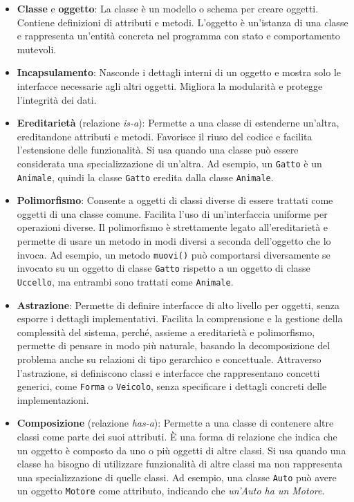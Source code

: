 \documentclass[
  letterpaper,
]{scrbook}
\begin{document}
\begin{itemize}
\item
  \textbf{Classe} e \textbf{oggetto}: La classe è un modello o schema
  per creare oggetti. Contiene definizioni di attributi e metodi.
  L'oggetto è un'istanza di una classe e rappresenta un'entità concreta
  nel programma con stato e comportamento mutevoli.
\item
  \textbf{Incapsulamento}: Nasconde i dettagli interni di un oggetto e
  mostra solo le interfacce necessarie agli altri oggetti. Migliora la
  modularità e protegge l'integrità dei dati.
\item
  \textbf{Ereditarietà} (relazione \emph{is-a}): Permette a una classe
  di estenderne un'altra, ereditandone attributi e metodi. Favorisce il
  riuso del codice e facilita l'estensione delle funzionalità. Si usa
  quando una classe può essere considerata una specializzazione di
  un'altra. Ad esempio, un \texttt{Gatto} è un \texttt{Animale}, quindi
  la classe \texttt{Gatto} eredita dalla classe \texttt{Animale}.
\item
  \textbf{Polimorfismo}: Consente a oggetti di classi diverse di essere
  trattati come oggetti di una classe comune. Facilita l'uso di
  un'interfaccia uniforme per operazioni diverse. Il polimorfismo è
  strettamente legato all'ereditarietà e permette di usare un metodo in
  modi diversi a seconda dell'oggetto che lo invoca. Ad esempio, un
  metodo \texttt{muovi()} può comportarsi diversamente se invocato su un
  oggetto di classe \texttt{Gatto} rispetto a un oggetto di classe
  \texttt{Uccello}, ma entrambi sono trattati come \texttt{Animale}.
\item
  \textbf{Astrazione}: Permette di definire interfacce di alto livello
  per oggetti, senza esporre i dettagli implementativi. Facilita la
  comprensione e la gestione della complessità del sistema, perché,
  assieme a ereditarietà e polimorfismo, permette di pensare in modo più
  naturale, basando la decomposizione del problema anche su relazioni di
  tipo gerarchico e concettuale. Attraverso l'astrazione, si definiscono
  classi e interfacce che rappresentano concetti generici, come
  \texttt{Forma} o \texttt{Veicolo}, senza specificare i dettagli
  concreti delle implementazioni.
\item
  \textbf{Composizione} (relazione \emph{has-a}): Permette a una classe
  di contenere altre classi come parte dei suoi attributi. È una forma
  di relazione che indica che un oggetto è composto da uno o più oggetti
  di altre classi. Si usa quando una classe ha bisogno di utilizzare
  funzionalità di altre classi ma non rappresenta una specializzazione
  di quelle classi. Ad esempio, una classe \texttt{Auto} può avere un
  oggetto \texttt{Motore} come attributo, indicando che \emph{un'Auto ha
  un Motore}.
\end{itemize}
\end{document}
